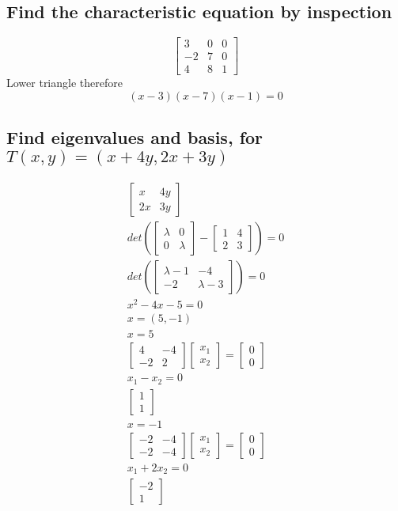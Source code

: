 \documentclass[12pt, a4paper]{article}
\begin{document}
		\subsection{Find the characteristic equation by inspection}
			$$\begin{bmatrix}3&0&0\\-2&7&0\\4&8&1\end{bmatrix}$$
			Lower triangle therefore
			$$(x-3)(x-7)(x-1)=0$$
		\subsection{Find eigenvalues and basis, for $T(x,y)=(x+4y,2x+3y)$}
			\begin{align*}
				\begin{bmatrix}x&4y\\2x&3y\end{bmatrix}\\
				det(\begin{bmatrix}\lambda&0\\0&\lambda\end{bmatrix}-\begin{bmatrix}1&4\\2&3\end{bmatrix})=0\\
				det(\begin{bmatrix}\lambda-1&-4\\-2&\lambda-3\end{bmatrix})=0\\
				x^2-4x-5=0\\
				x=(5,-1)\\
				\hline
				x=5\\
				\begin{bmatrix}4&-4\\-2&2\end{bmatrix}\begin{bmatrix}x_1\\x_2\end{bmatrix}=\begin{bmatrix}0\\0\end{bmatrix}\\
				x_1-x_2=0\\
				\begin{bmatrix}1\\1\end{bmatrix}\\
				\hline
				x=-1\\
				\begin{bmatrix}-2&-4\\-2&-4\end{bmatrix}\begin{bmatrix}x_1\\x_2\end{bmatrix}=\begin{bmatrix}0\\0\end{bmatrix}\\
				x_1+2x_2=0\\
				\begin{bmatrix}-2\\1\end{bmatrix}
			\end{align*}
\end{document}
